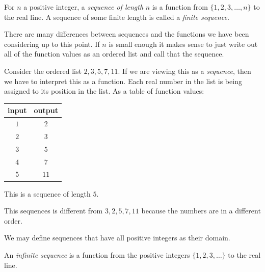 \begin{definition}
    For \(n\) a positive integer, a \emph{sequence of length} \(n\) is a function from \(\{1,2,3,\dots,n\}\) to the real line. A sequence of some finite length is called a \emph{finite sequence.}
\end{definition}

There are many differences between sequences and the functions we have been considering up to this point. If \(n\) is small enough it makes sense to just write out all of the function values as an ordered list and call that the sequence.

\begin{example}
    Consider the ordered list \(2,3,5,7,11.\) If we are viewing this as a \emph{sequence}, then we have to interpret this as a function. Each real number in the list is being assigned to its position in the list. As a table of function values:
    
    \begin{tabular}{c|c}
         input & output  \\\hline
         \(1\) & \(2\) \\
         \(2\) & \(3\) \\
         \(3\) & \(5\) \\
         \(4\) & \(7\) \\
         \(5\) & \(11\)
    \end{tabular}
    
    This is a sequence of length \(5.\)

    This sequences is different from \(3,2,5,7,11\) because the numbers are in a different order.
\end{example}

We may define sequences that have all positive integers as their domain.

\begin{definition}
    An \emph{infinite sequence} is a function from the positive integers \(\{1,2,3,\dots\}\) to the real line.
\end{definition}

